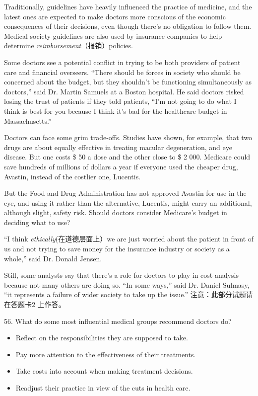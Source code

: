 \documentclass[UTF8,11pt]{ctexart}
\begin{document}
Traditionally, guidelines have heavily influenced the practice of medicine, and the latest ones are expected to make doctors more conscious of the economic consequences of their decisions, even though there’s no obligation to follow them. Medical society guidelines are also used by insurance companies to help determine\textit{ reimbursement}（报销）policies.


Some doctors see a potential conflict in trying to be both providers of patient care and financial overseers. “There should be forces in society who should be concerned about the budget, but they shouldn’t be functioning simultaneously as doctors,” said Dr. Martin Samuels at a Boston hospital. He said doctors risked losing the trust of patients if they told patients, “I’m not going to do what I think is best for you because I think it’s bad for the healthcare budget in Massachusetts.”


Doctors can face some grim trade-offs. Studies have shown, for example, that two drugs are about equally effective in treating macular degeneration, and eye disease. But one costs \$ 50 a dose and the other close to \$ 2 000. Medicare could save hundreds of millions of dollars a year if everyone used the cheaper drug, Avastin, instead of the costlier one, Lucentis.


But the Food and Drug Administration has not approved Avastin for use in the eye, and using it rather than the alternative, Lucentis, might carry an additional, although slight, safety risk. Should doctors consider Medicare’s budget in deciding what to use?


“I think\textit{ ethically}(在道德层面上）we are just worried about the patient in front of us and not trying to save money for the insurance industry or society as a whole,” said Dr. Donald Jensen.


Still, some analysts say that there’s a role for doctors to play in cost analysis because not many others are doing so. “In some ways,” said Dr. Daniel Sulmasy, “it represents a failure of wider society to take up the issue.” 注意：此部分试题请在答题卡2 上作答。


56. What do some most influential medical groups recommend doctors do?


\begin{itemize}[leftmargin=2em,itemsep=.2em,topsep=.4em]\item[A.] Reflect on the responsibilities they are supposed to take.
\item[B.] Pay more attention to the effectiveness of their treatments.
\item[C.] Take costs into account when making treatment decisions.
\item[D.] Readjust their practice in view of the cuts in health care.
\end{itemize}
\end{document}
